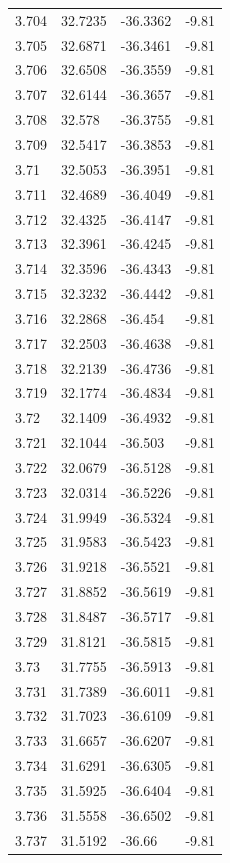\begin{tabular}{llll}
3.704 & 32.7235 & -36.3362 & -9.81 \\
3.705 & 32.6871 & -36.3461 & -9.81 \\
3.706 & 32.6508 & -36.3559 & -9.81 \\
3.707 & 32.6144 & -36.3657 & -9.81 \\
3.708 & 32.578 & -36.3755 & -9.81 \\
3.709 & 32.5417 & -36.3853 & -9.81 \\
3.71 & 32.5053 & -36.3951 & -9.81 \\
3.711 & 32.4689 & -36.4049 & -9.81 \\
3.712 & 32.4325 & -36.4147 & -9.81 \\
3.713 & 32.3961 & -36.4245 & -9.81 \\
3.714 & 32.3596 & -36.4343 & -9.81 \\
3.715 & 32.3232 & -36.4442 & -9.81 \\
3.716 & 32.2868 & -36.454 & -9.81 \\
3.717 & 32.2503 & -36.4638 & -9.81 \\
3.718 & 32.2139 & -36.4736 & -9.81 \\
3.719 & 32.1774 & -36.4834 & -9.81 \\
3.72 & 32.1409 & -36.4932 & -9.81 \\
3.721 & 32.1044 & -36.503 & -9.81 \\
3.722 & 32.0679 & -36.5128 & -9.81 \\
3.723 & 32.0314 & -36.5226 & -9.81 \\
3.724 & 31.9949 & -36.5324 & -9.81 \\
3.725 & 31.9583 & -36.5423 & -9.81 \\
3.726 & 31.9218 & -36.5521 & -9.81 \\
3.727 & 31.8852 & -36.5619 & -9.81 \\
3.728 & 31.8487 & -36.5717 & -9.81 \\
3.729 & 31.8121 & -36.5815 & -9.81 \\
3.73 & 31.7755 & -36.5913 & -9.81 \\
3.731 & 31.7389 & -36.6011 & -9.81 \\
3.732 & 31.7023 & -36.6109 & -9.81 \\
3.733 & 31.6657 & -36.6207 & -9.81 \\
3.734 & 31.6291 & -36.6305 & -9.81 \\
3.735 & 31.5925 & -36.6404 & -9.81 \\
3.736 & 31.5558 & -36.6502 & -9.81 \\
3.737 & 31.5192 & -36.66 & -9.81 \\

\end{tabular}
